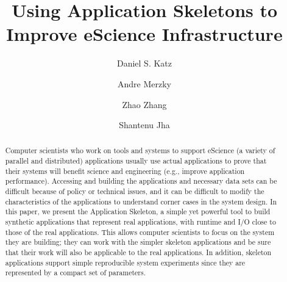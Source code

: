 \documentclass[preprint,12pt]{elsarticle}
\begin{document}
\begin{frontmatter}



\title{Using Application Skeletons to Improve eScience Infrastructure}


\author[ucanl]{Daniel S. Katz}

\author[rutgers]{Andre Merzky}

\author[ucb]{Zhao Zhang}

\author[rutgers]{Shantenu Jha}


\address[ucanl]{Computation Institute, University of Chicago \& Argonne National Laboratory, Chicago, IL, USA}
\address[rutgers]{RADICAL Laboratory, Rutgers University, New Brunswick, NJ, USA}
\address[ucb]{AMPLab, University of California, Berkeley, CA, USA}


\begin{abstract}

Computer scientists who work on tools and systems to support
eScience (a variety of parallel and distributed) applications usually use actual applications to prove that their
systems will benefit science and engineering (e.g., improve application performance). Accessing and building the applications and necessary data sets can be difficult because of policy
or technical issues, and it can be difficult to modify the characteristics of the applications to understand corner cases in the system design.
In this paper, we present the Application Skeleton, a simple yet powerful 
tool to build synthetic applications that represent real applications, with runtime and I/O 
close to those of the real applications. This allows computer 
scientists to focus on the system they are building; they can work with the simpler skeleton 
applications and be sure that their work will also be applicable to the real applications. 
In addition, skeleton applications support simple
reproducible system experiments since they are represented by a compact set of parameters.


\end{abstract}
\end{frontmatter}
\end{document}
